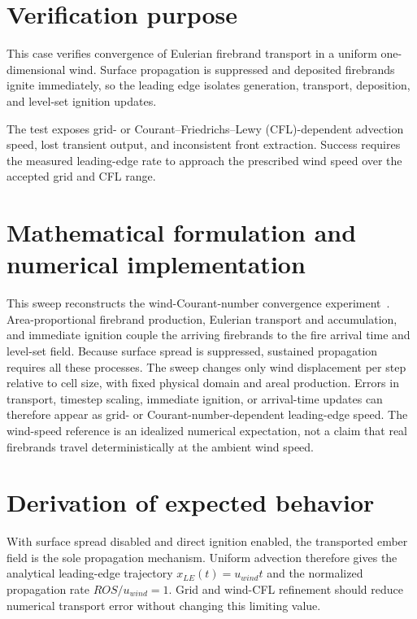 \section{Verification purpose}

This case verifies convergence of Eulerian firebrand transport in a uniform one-dimensional wind. Surface propagation is suppressed and deposited firebrands ignite immediately, so the leading edge isolates generation, transport, deposition, and level-set ignition updates.

The test exposes grid- or Courant--Friedrichs--Lewy (CFL)-dependent advection speed, lost transient output, and inconsistent front extraction. Success requires the measured leading-edge rate to approach the prescribed wind speed over the accepted grid and CFL range.

\section{Mathematical formulation and numerical implementation}

\begin{sloppypar}
This sweep reconstructs the wind-Courant-number convergence experiment~\cite{Qin2025}.
Area-proportional firebrand production, Eulerian transport and accumulation,
and immediate ignition couple the arriving firebrands to the fire arrival time
and level-set field. Because surface spread is suppressed, sustained propagation
requires all these processes. The sweep changes only wind displacement per step
relative to cell size, with fixed physical domain and areal production. Errors
in transport, timestep scaling, immediate ignition, or arrival-time updates can
therefore appear as grid- or Courant-number-dependent leading-edge speed. The
wind-speed reference is an idealized numerical expectation, not a claim that
real firebrands travel deterministically at the ambient wind speed.

\end{sloppypar}

\section{Derivation of expected behavior}
With surface spread disabled and direct ignition enabled, the transported ember field is the sole propagation mechanism. Uniform advection therefore gives the analytical leading-edge trajectory $x_{LE}(t)=u_{wind}t$ and the normalized propagation rate $ROS/u_{wind}=1$. Grid and wind-CFL refinement should reduce numerical transport error without changing this limiting value.

